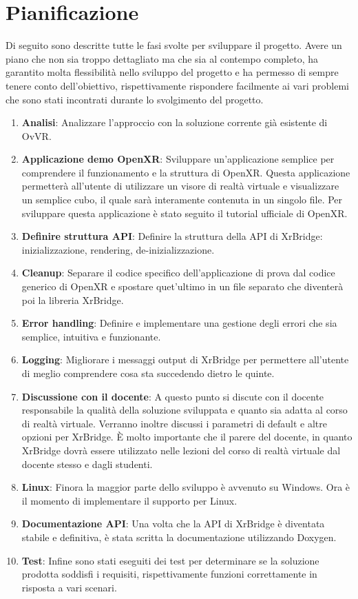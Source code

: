 \documentclass[twoside]{supsistudent}
\begin{document}
\section{Pianificazione}

Di seguito sono descritte tutte le fasi svolte per sviluppare il progetto. Avere un piano che non sia troppo dettagliato ma che sia al contempo completo, ha garantito molta flessibilità nello sviluppo del progetto e ha permesso di sempre tenere conto dell'obiettivo, rispettivamente rispondere facilmente ai vari problemi che sono stati incontrati durante lo svolgimento del progetto.

\begin{enumerate}
  \item \textbf{Analisi}: Analizzare l'approccio con la soluzione corrente già esistente di OvVR.
  \item \textbf{Applicazione demo OpenXR}: Sviluppare un'applicazione semplice per comprendere il funzionamento e la struttura di OpenXR. Questa applicazione permetterà all'utente di utilizzare un visore di realtà virtuale e visualizzare un semplice cubo, il quale sarà interamente contenuta in un singolo file. Per sviluppare questa applicazione è stato seguito il tutorial ufficiale di OpenXR.
  \item \textbf{Definire struttura API}: Definire la struttura della API di XrBridge: inizializzazione, rendering, de-inizializzazione.
  \item \textbf{Cleanup}: Separare il codice specifico dell'applicazione di prova dal codice generico di OpenXR e spostare quet'ultimo in un file separato che diventerà poi la libreria XrBridge.
  \item \textbf{Error handling}: Definire e implementare una gestione degli errori che sia semplice, intuitiva e funzionante.
  \item \textbf{Logging}: Migliorare i messaggi output di XrBridge per permettere all'utente di meglio comprendere cosa sta succedendo dietro le quinte.
  \item \textbf{Discussione con il docente}: A questo punto si discute con il docente responsabile la qualità della soluzione sviluppata e quanto sia adatta al corso di realtà virtuale. Verranno inoltre discussi i parametri di default e altre opzioni per XrBridge. È molto importante che il parere del docente, in quanto XrBridge dovrà essere utilizzato nelle lezioni del corso di realtà virtuale dal docente stesso e dagli studenti.
  \item \textbf{Linux}: Finora la maggior parte dello sviluppo è avvenuto su Windows. Ora è il momento di implementare il supporto per Linux.
  \item \textbf{Documentazione API}: Una volta che la API di XrBridge è diventata stabile e definitiva, è stata scritta la documentazione utilizzando Doxygen.
  \item \textbf{Test}: Infine sono stati eseguiti dei test per determinare se la soluzione prodotta soddisfi i requisiti, rispettivamente funzioni correttamente in risposta a vari scenari.
\end{enumerate}
\end{document}
